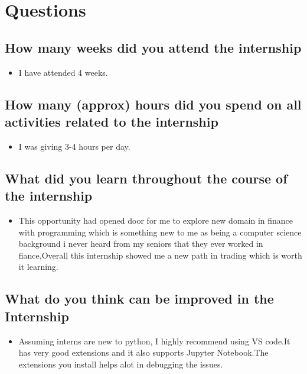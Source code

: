 \documentclass[12pt,a4paper]{article}
\begin{document}
\clearpage\thispagestyle{empty}
	
 


 
 
 \clearpage
\tableofcontents
\clearpage

\section{Questions}
\subsection{How many weeks did you attend the internship}
\begin{itemize}
    \item I have attended 4 weeks.
\end{itemize}
\subsection{How many (approx) hours did you spend on all activities related to the internship}
\begin{itemize}
    \item I was giving 3-4 hours per day.
\end{itemize}
\subsection{What did you learn throughout the course of the internship}
\begin{itemize}
    \item This opportunity had opened door for me  to explore new domain in finance with programming which is something new to me as being a computer science background i never heard from my seniors that they ever worked in fiance,Overall this internship showed me a new path in trading which is worth it learning.
\end{itemize}
\subsection{What do you think can be improved in the Internship}
\begin{itemize}
    \item Assuming interns are new to python, I highly recommend using VS code.It has very good extensions and it also supports Jupyter Notebook.The extensions you install helps alot in debugging the issues.
\end{itemize}
\end{document}
